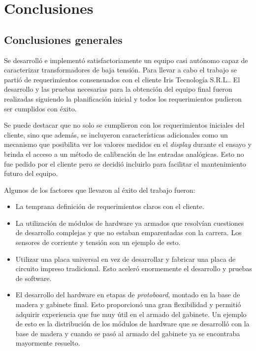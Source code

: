 
\chapter{Conclusiones} %

\label{Chapter5} %




\section{Conclusiones generales }

Se desarrolló e implementó satisfactoriamente un equipo casi autónomo capaz de caracterizar transformadores de baja tensión. Para llevar a cabo el trabajo se partió de requerimientos consensuados con el cliente Iris Tecnología S.R.L.. El desarrollo y las pruebas necesarias para la obtención del equipo final fueron realizadas siguiendo la planificación inicial y todos los requerimientos pudieron ser cumplidos con éxito.

Se puede destacar que no solo se cumplieron con los requerimientos iniciales del cliente, sino que además, se incluyeron características adicionales como un mecanismo que posibilita ver los valores medidos en el \textit{display} durante el ensayo y brinda el acceso a un método de calibración de las entradas analógicas. Esto no fue pedido por el cliente pero se decidió incluirlo para facilitar el mantenimiento futuro del equipo.

Algunos de los factores que llevaron al éxito del trabajo fueron:
\begin{itemize}
\item La temprana definición de requerimientos claros con el cliente.
\item La utilización de módulos de hardware ya armados que resolvían cuestiones de desarrollo complejas y que no estaban emparentadas con la carrera. Los sensores de corriente y tensión son un ejemplo de esto.
\item Utilizar una placa universal en vez de desarrollar y fabricar una placa de circuito impreso tradicional. Esto aceleró enormemente el desarrollo y pruebas de software.
\item El desarrollo del hardware en etapas de \textit{protoboard}, montado en la base de madera y gabinete final. Esto proporcionó una gran flexibilidad y permitió adquirir experiencia que fue muy útil en el armado del gabinete. Un ejemplo de esto es la distribución de los módulos de hardware que se desarrolló con la base de madera y cuando se pasó al armado del gabinete ya se encontraba mayormente resuelto.
\end{itemize}

